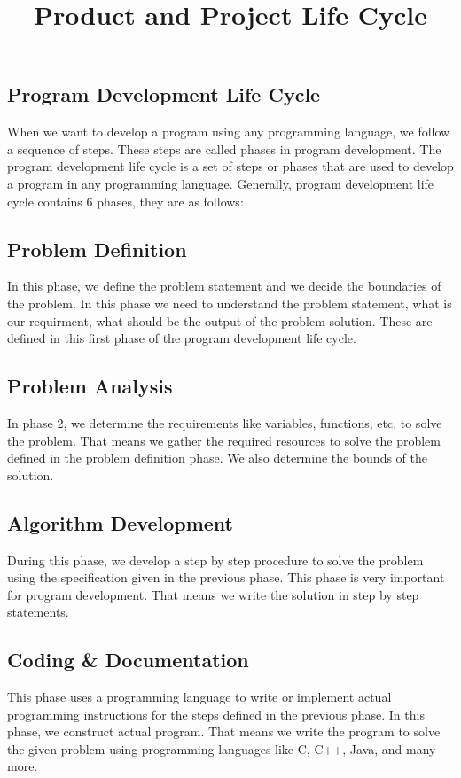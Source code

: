 \documentclass[18 pt]{article}
\begin{document}
\begin{large}

\title{Product and Project Life Cycle}
\author{}
\date{}
\maketitle


\tableofcontents

\leavevmode\thispagestyle{empty}\newpage

\begin{flushleft}

\section{Program Development Life Cycle}
When we want to develop a program using any programming language, we follow a sequence of steps. These steps are called phases in program development. The program development life cycle is a set of steps or phases that are used to develop a program in any programming language.
Generally, program development life cycle contains 6 phases, they are as follows:
\subsection{Problem Definition}
In this phase, we define the problem statement and we decide the boundaries of the problem. In this phase we need to understand the problem statement, what is our requirment, what should be the output of the problem solution. These are defined in this first phase of the program development life cycle.
\subsection{Problem Analysis}
In phase 2, we determine the requirements like variables, functions, etc. to solve the problem. That means we gather the required resources to solve the problem defined in the problem definition phase. We also determine the bounds of the solution.
\subsection{Algorithm Development}
During this phase, we develop a step by step procedure to solve the problem using the specification given in the previous phase. This phase is very important for program development. That means we write the solution in step by step statements.
\subsection{Coding & Documentation}
This phase uses a programming language to write or implement actual programming instructions for the steps defined in the previous phase. In this phase, we construct actual program. That means we write the program to solve the given problem using programming languages like C, C++, Java, and many more.

\end{flushleft}
\end{large}
\end{document}
